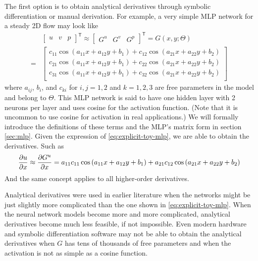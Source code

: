 The first option is to obtain analytical derivatives through symbolic differentiation or manual derivation.
For example, a very simple MLP network for a steady 2D flow may look like
\begin{equation}\label{eq:explicit-toy-mlp}
    \begin{aligned}
    &\begin{bmatrix}
        u &
        v &
        p
    \end{bmatrix}^\mathsf{T}
    \approx
    \begin{bmatrix}
        G^u &
        G^v &
        G^p
    \end{bmatrix}^\mathsf{T}
    =
    G(x, y; \Theta) \\
    = 
    &\begin{bmatrix}
    c_{11} \cos{\left(a_{11}x + a_{12}y + b_1\right)} + 
      c_{12} \cos{\left(a_{21}x + a_{22}y + b_2\right)} \\
    c_{21} \cos{\left(a_{11}x + a_{12}y + b_1\right)} + 
      c_{22} \cos{\left(a_{21}x + a_{22}y + b_2\right)} \\
    c_{31} \cos{\left(a_{11}x + a_{12}y + b_1\right)} + 
      c_{32} \cos{\left(a_{21}x + a_{22}y + b_2\right)} \\
    \end{bmatrix}
    \end{aligned}
\end{equation}
where $a_{ij}$, $b_i$, and $c_{ki}$ for $i,j=1,2$ and $k=1,2,3$ are free parameters in the model and belong to $\Theta$.
This MLP network is said to have one hidden layer with 2 neurons per layer and uses cosine for the activation function.
(Note that it is uncommon to use cosine for activation in real applications.)
We will formally introduce the definitions of these terms and the MLP's matrix form in section \ref{sec:mlp}.
Given the expression of \eqref{eq:explicit-toy-mlp}, we are able to obtain the derivatives.
Such as
\begin{equation}
    \begin{aligned}
    \frac{\partial u}{\partial x}
    \approx
    \frac{\partial G^u}{\partial x}
    =
    a_{11}c_{11}\cos\left(a_{11}x + a_{12}y + b_1\right) + a_{21}c_{12}\cos\left(a_{21}x + a_{22}y + b_2\right)
    \end{aligned}
\end{equation}
And the same concept applies to all higher-order derivatives.

Analytical derivatives were used in earlier literature when the networks might be just slightly more complicated than the one shown in \eqref{eq:explicit-toy-mlp}.
When the neural network models become more and more complicated, analytical derivatives become much less feasible, if not impossible.
Even modern hardware and symbolic differentiation software may not be able to obtain the analytical derivatives when $G$ has tens of thousands of free parameters and when the activation is not as simple as a cosine function.

